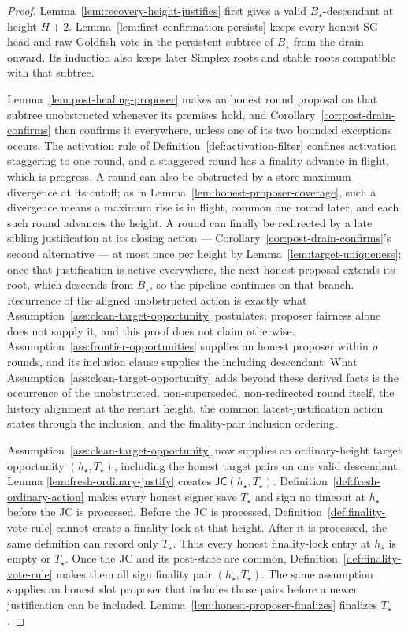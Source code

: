 \begin{proof}
Lemma~\ref{lem:recovery-height-justifies} first gives a valid
\(B_\star\)-descendant at height \(H+2\).
Lemma~\ref{lem:first-confirmation-persists} keeps every honest SG head and
raw Goldfish vote in the persistent subtree of \(B_\star\) from the drain
onward.  Its induction also keeps later Simplex roots and stable roots
compatible with that subtree.

Lemma~\ref{lem:post-healing-proposer} makes an honest round proposal on
that subtree unobstructed whenever its premises hold, and
Corollary~\ref{cor:post-drain-confirms} then confirms it everywhere,
unless one of its two bounded exceptions occurs.  The
activation rule of Definition~\ref{def:activation-filter} confines
activation staggering to one round, and a staggered round has a finality
advance in flight, which is progress.  A round can also be obstructed by a
store-maximum divergence at its cutoff; as in
Lemma~\ref{lem:honest-proposer-coverage}, such a divergence means a
maximum rise is in flight, common one round later, and each such round
advances the height.  A round can finally be redirected by a late
sibling justification at its closing action ---
Corollary~\ref{cor:post-drain-confirms}'s second alternative --- at most
once per height by Lemma~\ref{lem:target-uniqueness}; once that
justification is active everywhere, the next honest proposal extends its
root, which descends from \(B_\star\), so the pipeline continues on
that branch.  Recurrence of the aligned unobstructed action is
exactly what Assumption~\ref{ass:clean-target-opportunity} postulates;
proposer fairness alone does not supply it, and this proof does not claim
otherwise.
Assumption~\ref{ass:frontier-opportunities} supplies an honest proposer
within \(\rho\) rounds, and its inclusion clause supplies the including
descendant.  What Assumption~\ref{ass:clean-target-opportunity} adds
beyond these derived facts is the occurrence of the unobstructed,
non-superseded, non-redirected round itself, the history alignment at
the restart height,
the common latest-justification action states through the inclusion, and
the finality-pair inclusion ordering.

Assumption~\ref{ass:clean-target-opportunity} now supplies an
ordinary-height target opportunity
\((h_\star,T_\star)\), including the honest target pairs on one valid
descendant.  Lemma
\ref{lem:fresh-ordinary-justify} creates
\(\mathsf{JC}(h_\star,T_\star)\).
Definition~\ref{def:fresh-ordinary-action} makes every honest signer save
\(T_\star\) and sign no timeout at \(h_\star\) before the JC is processed.
Before the JC is processed, Definition~\ref{def:finality-vote-rule} cannot
create a finality lock at that height.  After it is processed, the same
definition can record only \(T_\star\).  Thus every honest finality-lock entry
at \(h_\star\) is empty or \(T_\star\).  Once the JC and its post-state are common,
Definition~\ref{def:finality-vote-rule} makes them all sign finality pair
\((h_\star,T_\star)\).  The same assumption supplies an honest slot proposer
that includes those pairs before a newer justification can be included.
Lemma~\ref{lem:honest-proposer-finalizes} finalizes
\(T_\star\).
\end{proof}

